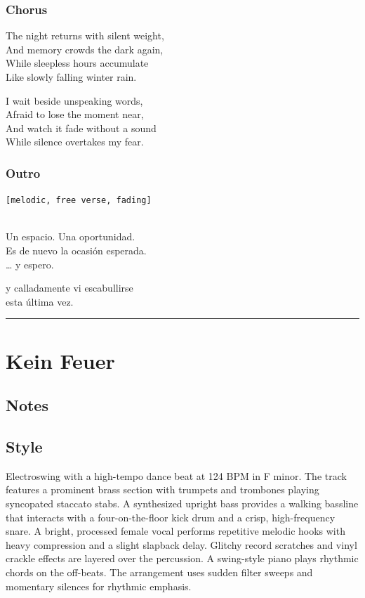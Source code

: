 \documentclass[]{article}
\begin{document}
\subsubsection{Chorus}\label{chorus-62}

The night returns with silent weight,\\
And memory crowds the dark again,\\
While sleepless hours accumulate\\
Like slowly falling winter rain.

I wait beside unspeaking words,\\
Afraid to lose the moment near,\\
And watch it fade without a sound\\
While silence overtakes my fear.

\subsubsection{Outro}\label{outro-10}

\texttt{{[}melodic,\ free\ verse,\ fading{]}}\strut \\
Un espacio. Una oportunidad.\\
Es de nuevo la ocasión esperada.\\
\ldots{} y espero.

y calladamente vi escabullirse\\
esta última vez.

\begin{center}\rule{0.5\linewidth}{0.5pt}\end{center}

\section{Kein Feuer}\label{kein-feuer}

\subsection{Notes}\label{notes-32}

\subsection{Style}\label{style-32}

Electroswing with a high-tempo dance beat at 124 BPM in F minor. The
track features a prominent brass section with trumpets and trombones
playing syncopated staccato stabs. A synthesized upright bass provides a
walking bassline that interacts with a four-on-the-floor kick drum and a
crisp, high-frequency snare. A bright, processed female vocal performs
repetitive melodic hooks with heavy compression and a slight slapback
delay. Glitchy record scratches and vinyl crackle effects are layered
over the percussion. A swing-style piano plays rhythmic chords on the
off-beats. The arrangement uses sudden filter sweeps and momentary
silences for rhythmic emphasis.
\end{document}
